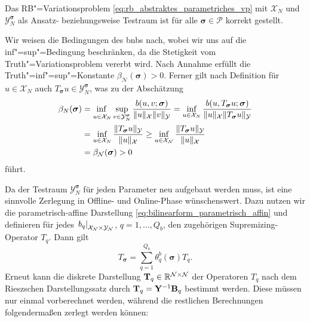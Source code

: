 \documentclass[../main.tex]{subfiles}
\begin{document}
\begin{Satz}\label{satz:rb_testraum_liefert_korrekt_gestelltes_problem}
    Das RB"=Variationsproblem \cref{eq:rb_abstraktes_parametriches_vp} mit $\mathcal X_{N}$ und $\mathcal Y_{N}^{\bm \sigma}$ als Ansatz- beziehungsweise Testraum ist für alle $\bm \sigma \in \mathcal P$ korrekt gestellt.

    \begin{Beweis}
        Wir weisen die Bedingungen des \acl{bnb}s nach, wobei wir uns auf die inf"=sup"=Bedingung beschränken, da die Stetigkeit vom Truth"=Variationsproblem vererbt wird.
        Nach Annahme erfüllt die Truth"=inf"=sup"=Konstante $\beta_{\mathcal N}(\bm \sigma) > 0$.
        Ferner gilt nach Definition für $u \in \mathcal X_{N}$ auch $T_{\bm \sigma}u \in \mathcal Y_{N}^{\bm \sigma}$, was zu der Abschätzung
        \begin{equation}
            \begin{aligned}
                \beta_{N}(\bm \sigma)
                &= \infsup{u \in \mathcal X_{N}}{v \in \mathcal Y_{N}^{\bm \sigma}} \frac{b(u, v; \bm \sigma)}{\norm{u}_{\mathcal X} \norm{v}_{\mathcal Y}}
                = \inf_{u \in \mathcal X_{N}} \frac{b(u, T_{\bm \sigma}u; \bm \sigma)}{\norm{u}_{\mathcal X} \norm{T_{\bm \sigma} u}_{\mathcal Y}}
                \\&= \inf_{u \in \mathcal X_{N}} \frac{\norm{T_{\bm \sigma}u}_{\mathcal Y}}{\norm{u}_{\mathcal X}}
                \geq \inf_{u \in \mathcal X_{\mathcal N}} \frac{\norm{T_{\bm \sigma}u}_{\mathcal Y}}{\norm{u}_{\mathcal X}}
                \\&= \beta_{\mathcal N}(\bm \sigma) > 0
            \end{aligned}
        \end{equation}
        führt.
    \end{Beweis}
\end{Satz}

Da der Testraum $\mathcal Y_{N}^{\bm \sigma}$ für jeden Parameter neu aufgebaut werden muss, ist eine sinnvolle Zerlegung in Offline- und Online-Phase wünschenswert.
Dazu nutzen wir die parametrisch-affine Darstellung \cref{eq:bilinearform_parametrisch_affin} und definieren für jedes $\left.b_{q}\right|_{\mathcal X_{\mathcal N} \times \mathcal Y_{\mathcal N}}$, $q = 1, \dots, Q_b$, den zugehörigen Supremizing-Operator $T_{q}$.
Dann gilt
\begin{equation}
    T_{\bm \sigma} = \sum_{q = 1}^{Q_b} \theta_{q}^{b}(\bm \sigma) T_{q}.
\end{equation}
Erneut kann die diskrete Darstellung $\mathbf{T}_{q} \in \mathbb{R}^{\mathcal N \times \mathcal N}$ der Operatoren $T_q$ nach dem Rieszschen Darstellungssatz durch $\mathbf{T}_{q} = \mathbf{Y}^{-1} \mathbf{B}_{q}$ bestimmt werden.
Diese müssen nur einmal vorberechnet werden, während die restlichen Berechnungen folgendermaßen zerlegt werden können:
\end{document}
